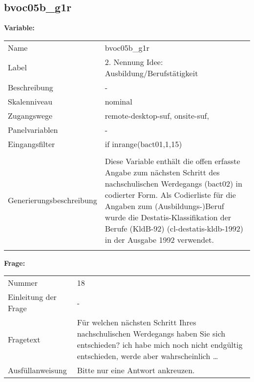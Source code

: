 	
	
	\subsection{bvoc05b\_g1r}
	\label{subSection:bvoc05b_g1r}

	\noindent\textbf{Variable:}\\
		\begin{tabular}{lL{11.3cm}}
			\label{tableVariable:bvoc05b_g1r}
			Name & bvoc05b\_g1r \\
			Label & 2. Nennung Idee: Ausbildung/Berufstätigkeit \\
			Beschreibung & - \\
			Skalenniveau & nominal \\
			Zugangswege &
				remote-desktop-suf,
				onsite-suf,
 \\
			Panelvariablen & -
			 \\
			Eingangsfilter & if inrange(bact01,1,15) \\
 \\
					Generierungsbeschreibung & Diese Variable enthält die offen erfasste Angabe zum nächsten Schritt des nachschulischen Werdegangs (bact02) in codierter Form. Als Codierliste für die Angaben zum (Ausbildungs-)Beruf wurde die Destatis-Klassifikation der Berufe (KldB-92) (cl-destatis-kldb-1992) in der Ausgabe 1992 verwendet. 
				 \\	
			 \\
		\end{tabular}

		\vspace*{1 cm}
		\noindent\textbf{Frage:}\\
		\begin{tabular}{lL{11.3cm}}
			\label{tableQuestion:bvoc05b_g1r}
			Nummer & 18 \\
			Einleitung der Frage & - \\
			Fragetext & Für welchen nächsten Schritt Ihres nachschulischen Werdegangs haben Sie sich entschieden?
ich habe mich noch nicht endgültig entschieden, werde aber wahrscheinlich … \\
			Ausfüllanweisung & Bitte nur eine Antwort ankreuzen. \\
		\end{tabular}





